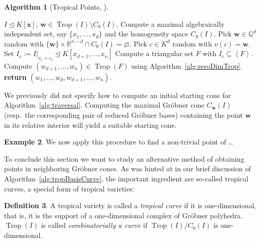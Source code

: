\documentclass[
  paper=a4,
  titlepage,
  bibliography=totoc,
  pagesize=pdftex
]{scrartcl}
\numberwithin{figure}{section}
\numberwithin{equation}{section}
\numberwithin{table}{section}
\newcommand*\setR{\mathds{R}}
\newcommand*\setQ{\mathds{Q}}
\newcommand*\setT{\mathds{T}}
\newcommand*\ideal[1]{\left\langle #1 \right\rangle}
\let\vec\mathbf
\let\idealof\trianglelefteq
\DeclareMathOperator{\Trop}{Trop}
\theoremstyle{definition}
\newtheorem{definition}{Definition}
\newtheorem{example}[definition]{Example}
\newtheorem{algo}[definition]{Algorithm}
\numberwithin{definition}{section}
\begin{document}
\begin{algo}[Tropical Points, {\cite[Algorithm~3.3]{tropPointsLinks}}]\
  \begin{algorithmic}[1]
    \Require $I \idealof K[\vec x]$,
    \Ensure $\vec w \in \Trop(I) \setminus C_0(I)$.
    \State Compute a maximal algebraically independent set, say $\{x_1, \dots, x_d\}$ and
    the homogeneity space $C_0(I)$.
    \Repeat
      \State Pick $\vec w \in \setQ^d$ random with $\{\vec w\} \times \setR^{n-d} \cap
        C_0(I) = \varnothing$.
      \State Pick $c \in K^d$ random with $\nu(c) = \vec w$.
      \State Set $I_c := I|_{x_i = c_i} \idealof K[x_{d+1}, \dots, x_n]$
    \Until{$\dim(I_c) = 0$ and $V(I_c) \subseteq \setT^{n-d}$}
    \State Compute a triangular set $F$ with $I_c \subseteq \ideal F$.
    \State Compute $(w_{d+1}, \dots, w_n) \in \Trop(F)$ using
      Algorithm~\ref{alg:zeroDimTrop}.
    \State\textbf{return} $(w_1, \dots, w_d, w_{d+1}, \dots, w_n)$.
  \end{algorithmic}
  \label{alg:tropicalPoint}
\end{algo}

We previously did not specify how to compute an initial starting cone for
Algorithm~\ref{alg:traversal}. Computing the maximal Gröbner cone $C_{\vec w}(I)$ (resp.\
the corresponding pair of reduced Gröbner bases) containing the point $\vec w$ in its
relative interior will yield a suitable starting cone.

\begin{example}
  We now apply this procedure to find a non-trivial point of \dots
\end{example}

To conclude this section we want to study an alternative method of obtaining points in
neighboring Gröbner cones. As was hinted at in our brief discussion of
Algorithm~\ref{alg:tropBasisCurve}, the important ingredient are so-called tropical
curves, a special form of tropical varieties:

\begin{definition}
  A tropical variety is called a \emph{tropical curve} if it is one-dimensional, that is,
  it is the support of a one-dimensional complex of Gröbner polyhedra. $\Trop(I)$ is
  called \emph{combinatorially a curve} if $\Trop(I)/C_0(I)$ is one-dimensional.
\end{definition}
\end{document}
